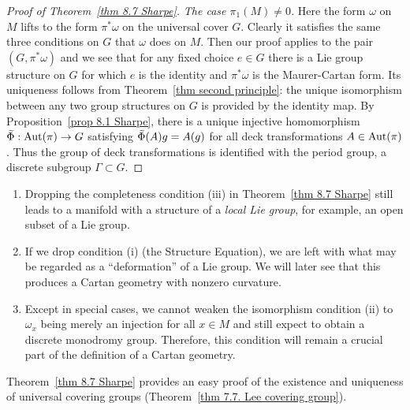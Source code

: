 \begin{proof}[Proof of Theorem~\ref{thm 8.7 Sharpe}]
    \emph{The case $\pi_1(M)\neq 0$.} Here the form $\omega$ on $M$ lifts to the form $\pi^\ast \omega$ on the universal cover $G$. Clearly it satisfies the same three conditions on $G$ that $\omega$ does on $M$. Then our proof applies to the pair $(G,\pi^\ast\omega)$ and we see that for any fixed choice $e\in G$ there is a Lie group structure on $G$ for which $e$ is the identity and $\pi^\ast\omega$ is the Maurer-Cartan form. Its uniqueness follows from Theorem~\ref{thm second principle}: the unique isomorphism between any two group structures on $G$ is provided by the identity map. By Proposition~\ref{prop 8.1 Sharpe}, there is a unique injective homomorphism $\wt{\Phi}:\Aut(\pi)\to G$ satisfying $\wt{\Phi}(A)g=A(g)$ for all deck transformations $A\in \operatorname{Aut}(\pi)$. Thus the group of deck transformations is identified with the period group, a discrete subgroup $\Gamma\subset G$.
\end{proof}

\begin{rem}
    \begin{enumerate}
        \item Dropping the completeness condition (iii) in Theorem~\ref{thm 8.7 Sharpe} still leads to a manifold with a structure of a \emph{local Lie group}, for example, an open subset of a Lie group.
        \item If we drop condition (i) (the Structure Equation), we are left with what may be regarded as a ``deformation'' of a Lie group. We will later see that this produces a Cartan geometry with nonzero curvature.
        \item Except in special cases, we cannot weaken the isomorphism condition (ii) to $\omega_x$ being merely an injection for all $x\in M$ and still expect to obtain a discrete monodromy group. Therefore, this condition will remain a crucial part of the definition of a Cartan geometry.
    \end{enumerate}
\end{rem}

Theorem~\ref{thm 8.7 Sharpe} provides an easy proof of the existence and uniqueness of universal covering groups (Theorem~\ref{thm 7.7. Lee covering group}).

